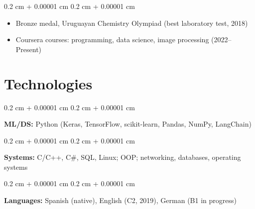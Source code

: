 \documentclass[10pt, letterpaper]{article}
\newenvironment{highlightsforbulletentries}{
    \begin{itemize}[
        topsep=0.10 cm,
        parsep=0.10 cm,
        partopsep=0pt,
        itemsep=0pt,
        leftmargin=10pt
    ]
}{
    \end{itemize}
} %
\newenvironment{onecolentry}{
    \begin{adjustwidth}{
        0.2 cm + 0.00001 cm
    }{
        0.2 cm + 0.00001 cm
    }
}{
    \end{adjustwidth}
} %
\begin{document}
        \begin{onecolentry}
            \begin{highlightsforbulletentries}
                \item Bronze medal, Uruguayan Chemistry Olympiad (best laboratory test, 2018)
                \item Coursera courses: programming, data science, image processing (2022--Present)
            \end{highlightsforbulletentries}
        \end{onecolentry}

    \section{Technologies}

        \begin{onecolentry}
            \textbf{ML/DS:} Python (Keras, TensorFlow, scikit-learn, Pandas, NumPy, LangChain)
        \end{onecolentry}

        \vspace{0.1 cm}

        \begin{onecolentry}
            \textbf{Systems:} C/C++, C\#, SQL, Linux; OOP; networking, databases, operating systems
        \end{onecolentry}

        \vspace{0.1 cm}

        \begin{onecolentry}
            \textbf{Languages:} Spanish (native), English (C2, 2019), German (B1 in progress)
        \end{onecolentry}
\end{document}

